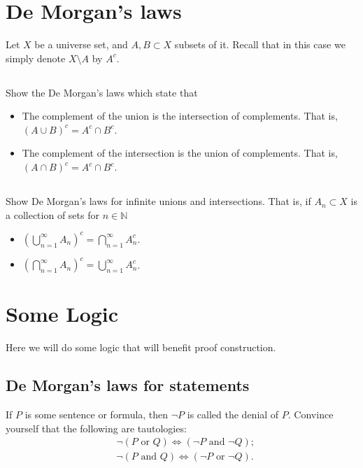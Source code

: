 \documentclass[11pt,letterpaper]{article}
\begin{document}
\section{De Morgan's laws}
Let $X$ be a universe set, and $A, B \subset X$ subsets of it. Recall that in this case we simply denote $X \setminus A$ by $A^c$. 

\subsection{}
Show the De Morgan's laws which state that
\begin{itemize}
    \item The complement of the union is the intersection of complements. That is, $(A \cup B)^c = A^c \cap B^c$.
    \item The complement of the intersection is the union of complements. That is, $(A \cap B)^c = A^c \cap B^c$.
\end{itemize}

\subsection{}
Show De Morgan's laws for infinite unions and intersections. That is, if $A_n \subset X$ is a collection of sets for $n \in \mathbb N$
\begin{itemize}
\item $\left( \bigcup_{n=1}^\infty A_n \right)^c = \bigcap_{n=1}^\infty A_n^c$.
\item $\left( \bigcap_{n=1}^\infty A_n \right)^c = \bigcup_{n=1}^\infty A_n^c$.
\end{itemize}

\section{Some Logic}
Here we will do some logic that will benefit proof construction.

\subsection{De Morgan's laws for statements}
If $P$ is some sentence or formula, then $\neg P$ is called the denial of $P$. Convince yourself that the following are tautologies:
\begin{align}
    &\neg (P \text{ or } Q) \Leftrightarrow (\neg P \text{ and } \neg Q);\\
    &\neg (P \text{ and } Q) \Leftrightarrow (\neg P \text{ or } \neg Q).
\end{align}
\end{document}
